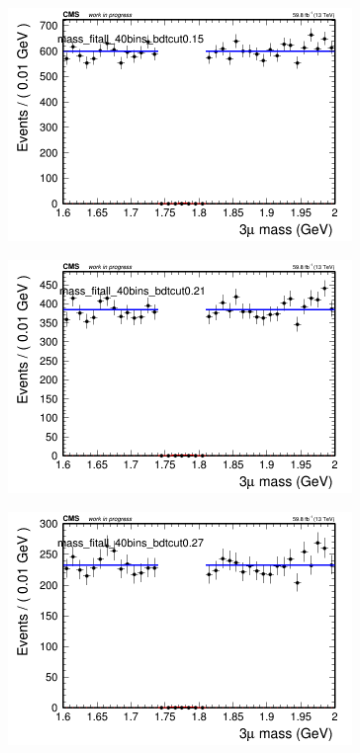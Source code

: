 \begin{figure}[H]
    \centering
    \begin{subfigure}{0.2\textwidth}
        \includegraphics[width=\textwidth]{flat_fit/plots/all/massfit_all_40bins_bdtcut0.15.png}
        \caption{}
    \end{subfigure}
    \begin{subfigure}{0.2\textwidth}
        \includegraphics[width=\textwidth]{flat_fit/plots/all/massfit_all_40bins_bdtcut0.21.png}
        \caption{}
    \end{subfigure}
    \begin{subfigure}{0.2\textwidth}
        \includegraphics[width=\textwidth]{flat_fit/plots/all/massfit_all_40bins_bdtcut0.27.png}

\end{subfigure}
\end{figure}

